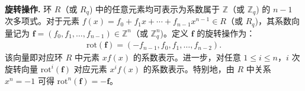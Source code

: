 \documentclass[12pt,a4paper]{article}
\numberwithin{equation}{section}
\begin{document}


\textbf{旋转操作.} 
环 $R$（或 $R_q$) 中的任意元素均可表示为系数属于 $\mathbb{Z}$（或 $\mathbb{Z}_q$) 的 $n-1$ 次多项式。对于元素 $f(x) = f_0 + f_1x + \cdots + f_{n-1}x^{n-1} \in R$（或 $R_q$)，其系数向量记为 $\mathbf{f} = (f_0, f_1, \ldots , f_{n-1}) \in \mathbb{Z}^n$（或 $\mathbb{Z}^n_q$)。定义 $\mathbf{f}$ 的旋转操作为：
\begin{align}
    \mathrm{rot}(\mathbf{f}) = (-f_{n-1}, f_0, f_1, \ldots , f_{n-2}).
\end{align}
该向量即对应环 $R$ 中元素 $xf(x)$ 的系数表示。进一步，对任意 $1 \leq i \leq n$，$i$ 次旋转向量 $\mathrm{rot}^i(\mathbf{f})$ 对应元素 $x^if(x)$ 的系数表示。特别地，由 $R$ 中关系 $x^n = -1$ 可得 $\mathrm{rot}^n(\mathbf{f}) = -\mathbf{f}$。
\end{document}

